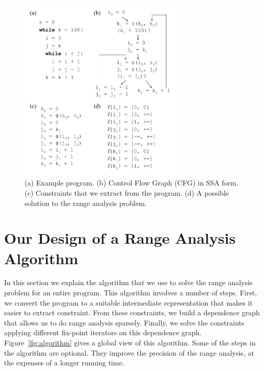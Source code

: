 \documentclass{llncs}
\begin{document}
\begin{figure}[t!]
\begin{center}
\includegraphics[width=0.7\textwidth]{images/ex1}
\end{center}
\caption{\label{fig:ex1}
(a) Example program.
(b) Control Flow Graph (CFG) in SSA form.
(c) Constraints that we extract from the program.
(d) A possible solution to the range analysis problem.}
\end{figure}

\section{Our Design of a Range Analysis Algorithm}
\label{sec:algo}


In this section we explain the algorithm that we use to solve the range
analysis problem for an entire program.
This algorithm involves a number of steps.
First, we convert the program to a suitable intermediate representation that
makes it easier to extract constraint.
From these constraints, we build a dependence graph that allows us to do
range analysis sparsely.
Finally, we solve the constraints applying different fix-point iterators on
this dependence graph.
Figure~\ref{fig:algorithm} gives a global view of this algorithm.
Some of the steps in the algorithm are optional.
They improve the precision of the range analysis, at the expenses of a longer
running time.
\end{document}
